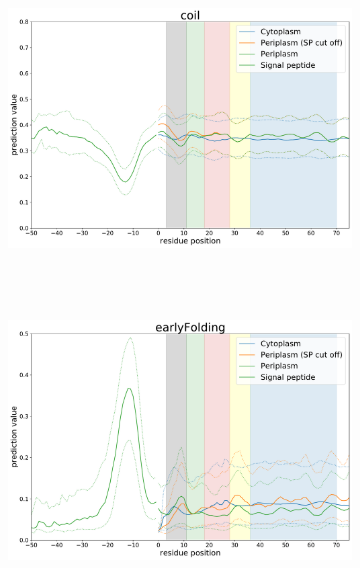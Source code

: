 ~\begin{figure}[h!]
	\ContinuedFloat
	~\begin{subfigure}[b]{\linewidth}
		\centering
		\includegraphics[width=\linewidth, height=0.46\textheight, keepaspectratio ]{./results/general_comparison/local_comparison/img/local_coil.pdf}
		\label{fig:local_coil}
	~\end{subfigure}
	\newline
	~\begin{subfigure}[b]{\linewidth}
		\centering
		\includegraphics[width=\linewidth, height=0.46\textheight, keepaspectratio ]{./results/general_comparison/local_comparison/img/local_earlyFolding.pdf}
		\label{fig:local_earlyfolding}
	~\end{subfigure}
~\end{figure}



